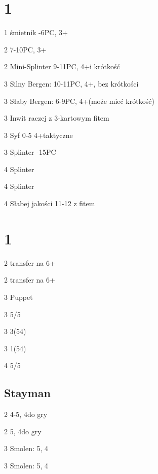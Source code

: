 \documentclass[12pt, a4paper]{article}
\begin{document}
\section*{1\spades}
\sequence{{1\spades}}
\begin{options}[2]
    \item[1\nt] \nf śmietnik -6PC, 3+\spades
    \item[2\spades] 7-10PC, 3+\spades
    \item[2\nt] Mini-Splinter 9-11PC, 4+\spades i krótkość \br
    \item[3\clubs] Silny Bergen: 10-11PC, 4+\spades, bez krótkości
    \item[3\diams] Słaby Bergen: 6-9PC, 4+\spades (może mieć krótkość)
    \item[3\hearts] Inwit raczej z 3-kartowym fitem \spades \br
    \item[3\spades] Syf 0-5 4+\spades taktyczne
    \item[3\nt] Splinter -15PC  
    \item[4\clubs] Splinter
    \item[4\diams] Splinter
    \item[4\hearts] Słabej jakości 11-12 z fitem    
\end{options}


\pagebreak
\section*{1\ntx}
\begin{options}[2]
    \item[2\spades] transfer na 6+\clubs \orr \inv \bal
    \item[2\nt] transfer na 6+\diams
    \item[3\clubs] Puppet
    \item[3\diams] 5/5 \twosuit{\clubs}{\diams}
    \item[3\hearts] 3\hearts(54)    
    \item[3\spades] 1\hearts(54) 
    \item[4\clubs] 5/5 \twosuit{\hearts}{\spades} 
\end{options}

\subsection*{Stayman}
\begin{options}[2]
    \item[2\hearts] 4-5\hearts, 4\spades do gry
    \item[2\spades] 5\spades, 4\hearts do gry
    \item[3\hearts] Smolen: 5\spades, 4\hearts \gf
    \item[3\spades] Smolen: 5\hearts, 4\spades \gf 
\end{options}
\end{document}
